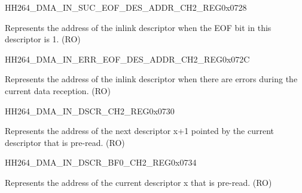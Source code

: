     
    \begin{register}{H}{H264\_DMA\_IN\_SUC\_EOF\_DES\_ADDR\_CH2\_REG}{0x0728}\label{regdesc:H264DMAINSUCEOFDESADDRCH2REG}
    \regnewline%
    \begin{regdesc}\begin{reglist}
    \label{fielddesc:H264DMAINSUCEOFDESADDRCH2}\item [H264\_DMA\_IN\_SUC\_EOF\_DES\_ADDR\_CH2] Represents the address of the inlink descriptor when the EOF bit in this descriptor is 1. (RO)
    \end{reglist}\end{regdesc}
    \end{register}
    
    
    \begin{register}{H}{H264\_DMA\_IN\_ERR\_EOF\_DES\_ADDR\_CH2\_REG}{0x072C}\label{regdesc:H264DMAINERREOFDESADDRCH2REG}
    \regnewline%
    \begin{regdesc}\begin{reglist}
    \label{fielddesc:H264DMAINERREOFDESADDRCH2}\item [H264\_DMA\_IN\_ERR\_EOF\_DES\_ADDR\_CH2] Represents the address of the inlink descriptor when there are errors during the current data reception. (RO)
    \end{reglist}\end{regdesc}
    \end{register}
    
    
    \begin{register}{H}{H264\_DMA\_IN\_DSCR\_CH2\_REG}{0x0730}\label{regdesc:H264DMAINDSCRCH2REG}
    \regnewline%
    \begin{regdesc}\begin{reglist}
    \label{fielddesc:H264DMAINLINKDSCRCH2}\item [H264\_DMA\_INLINK\_DSCR\_CH2] Represents the address of the next descriptor x+1 pointed by the current descriptor that is pre-read. (RO)
    \end{reglist}\end{regdesc}
    \end{register}
    
    
    \begin{register}{H}{H264\_DMA\_IN\_DSCR\_BF0\_CH2\_REG}{0x0734}\label{regdesc:H264DMAINDSCRBF0CH2REG}
    \regnewline%
    \begin{regdesc}\begin{reglist}
    \label{fielddesc:H264DMAINLINKDSCRBF0CH2}\item [H264\_DMA\_INLINK\_DSCR\_BF0\_CH2] Represents the address of the current descriptor x that is pre-read. (RO)
    \end{reglist}\end{regdesc}
    \end{register}
    
